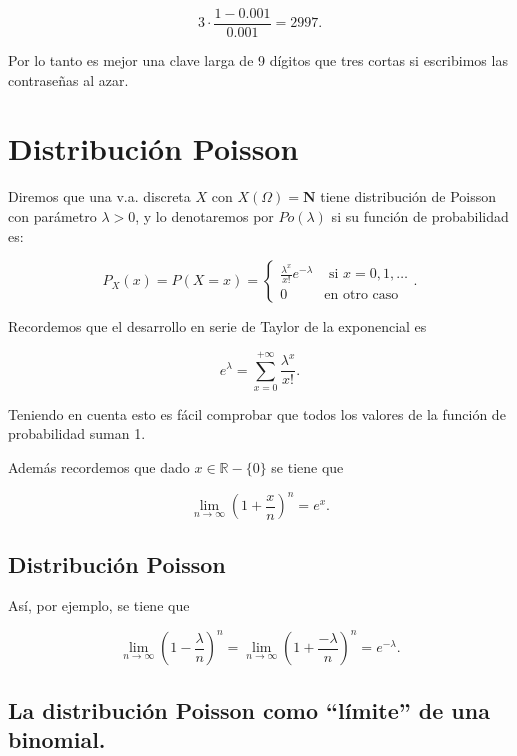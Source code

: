\documentclass[]{book}
\begin{document}
\[3\cdot \frac{1-0.001}{0.001}=2997.\]

Por lo tanto es mejor una clave larga de 9 dígitos que tres cortas si escribimos las contraseñas al azar.

\hypertarget{distribuciuxf3n-poisson}{%
\section{Distribución Poisson}\label{distribuciuxf3n-poisson}}

Diremos que una v.a. discreta \(X\) con \(X(\Omega)=\mathbf{N}\) tiene distribución de Poisson con parámetro \(\lambda>0\), y lo denotaremos por \(Po(\lambda)\) si su función de probabilidad es:

\[
P_{X}(x)=P(X=x)=
\left\{\begin{array}{ll}
\frac{\lambda^x}{x!} e^{-\lambda}& \mbox{ si } x=0,1,\ldots\\
0 & \mbox{en otro caso}\end{array}\right..
\]

Recordemos que el desarrollo en serie de Taylor de la exponencial es

\[
e^{\lambda}=\sum_{x=0}^{+\infty} \frac{\lambda^x}{x!}.
\]

Teniendo en cuenta esto es fácil comprobar que todos los valores de la función de probabilidad suman 1.

Además recordemos que dado \(x\in\mathbb{R}-\{0\}\) se tiene que

\[
\lim_{n\to\infty} \left(1+\frac{x}{n}\right)^n=e^x.
\]

\hypertarget{distribuciuxf3n-poisson-1}{%
\subsection{Distribución Poisson}\label{distribuciuxf3n-poisson-1}}

Así, por ejemplo, se tiene que

\[
\lim_{n\to\infty} \left(1-\frac{\lambda}{n}\right)^n=\lim_{n\to\infty} \left(1+\frac{-\lambda}{n}\right)^n=e^{-\lambda}.
\]

\hypertarget{la-distribuciuxf3n-poisson-como-luxedmite-de-una-binomial.}{%
\subsection{La distribución Poisson como ``límite'' de una binomial.}\label{la-distribuciuxf3n-poisson-como-luxedmite-de-una-binomial.}}
\end{document}
